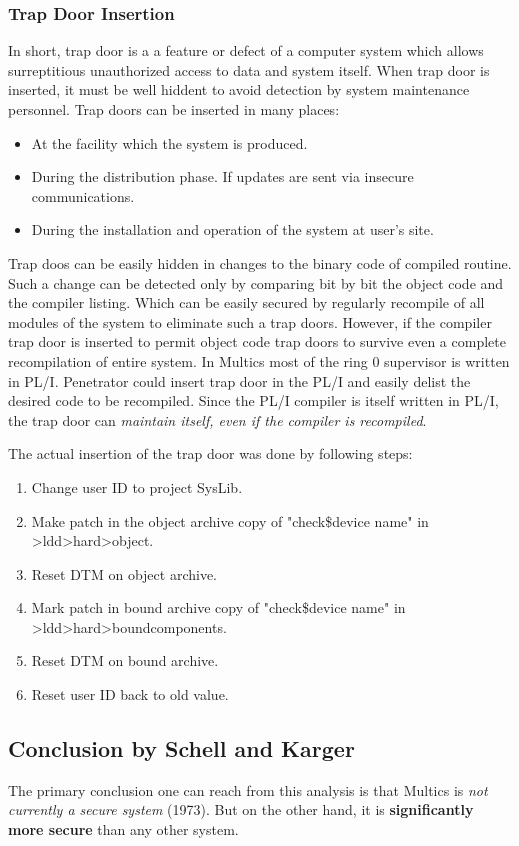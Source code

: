 \subsubsection{Trap Door Insertion}

In short, trap door is a a feature or defect of a computer system which allows surreptitious unauthorized 
access to data and system itself. When trap door is inserted, it must be well hiddent to avoid detection by system
maintenance personnel.
Trap doors can be inserted in many places:
\begin{itemize}
    \item At the facility which the system is produced.
    \item During the distribution phase. If updates are sent via insecure communications.
    \item During the installation and operation of the system at user's site.
\end{itemize}

Trap doos can be easily hidden in changes to the binary code of compiled routine. Such a change can be 
detected only by comparing bit by bit the object code and the compiler listing. Which can be easily secured 
by regularly recompile of all modules of the system to eliminate such a trap doors.
However, if the compiler trap door is inserted to permit object code trap doors to survive even a complete 
recompilation of entire system. 
In Multics most of the ring 0 supervisor is written in PL/I. Penetrator could insert trap door in the PL/I and 
easily delist the desired code to be recompiled.
Since the PL/I compiler is itself written in PL/I, the trap door can \textit{maintain itself, even if the 
compiler is recompiled}.

The actual insertion of the trap door was done by following steps:
\begin{enumerate}
    \item Change user ID to project SysLib.
    \item Make patch in the object archive copy of "check\$device\underline{} name" in >ldd>hard>object.
    \item Reset DTM on object archive.
    \item Mark patch in bound archive copy of "check\$device\underline{} name" in >ldd>hard>bound\underline{}components.
    \item Reset DTM on bound archive.
    \item Reset user ID back to old value.
\end{enumerate}


\subsection{Conclusion by Schell and Karger}

The primary conclusion one can reach from this analysis is that Multics is \textit{not currently a secure system} (1973).
But on the other hand, it is \textbf{significantly more secure} than any other system.

